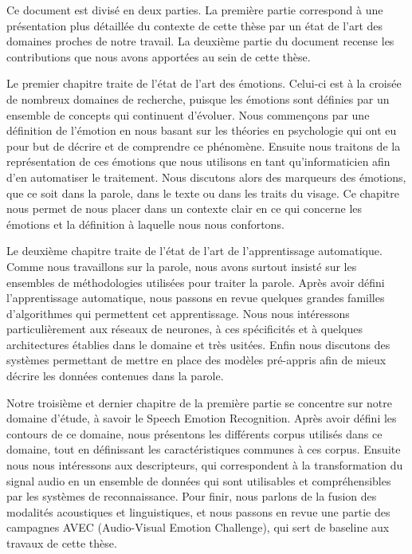 Ce document est divisé en deux parties. La première partie correspond à une présentation plus détaillée du contexte de cette thèse par un état de l'art des domaines proches de notre travail. La deuxième partie du document recense les contributions que nous avons apportées au sein de cette thèse.

Le premier chapitre traite de l'état de l'art des émotions. Celui-ci est à la croisée de nombreux domaines de recherche, puisque les émotions sont définies par un ensemble de concepts qui continuent d'évoluer. Nous commençons par une définition de l'émotion en nous basant sur les théories en psychologie qui ont eu pour but de décrire et de comprendre ce phénomène. Ensuite nous traitons de la représentation de ces émotions que nous utilisons en tant qu'informaticien afin d'en automatiser le traitement. Nous discutons alors des marqueurs des émotions, que ce soit dans la parole, dans le texte ou dans les traits du visage. Ce chapitre nous permet de nous placer dans un contexte clair en ce qui concerne les émotions et la définition à laquelle nous nous confortons.

Le deuxième chapitre traite de l'état de l'art de l'apprentissage automatique. Comme nous travaillons sur la parole, nous avons surtout insisté sur les ensembles de méthodologies utilisées pour traiter la parole. Après avoir défini l'apprentissage automatique, nous passons en revue quelques grandes familles d'algorithmes qui permettent cet apprentissage. Nous nous intéressons particulièrement aux réseaux de neurones, à ces spécificités et à quelques architectures établies dans le domaine et très usitées. Enfin nous discutons des systèmes permettant de mettre en place des modèles pré-appris afin de mieux décrire les données contenues dans la parole.

Notre troisième et dernier chapitre de la première partie se concentre sur notre domaine d'étude, à savoir le Speech Emotion Recognition. Après avoir défini les contours de ce domaine, nous présentons les différents corpus utilisés dans ce domaine, tout en définissant les caractéristiques communes à ces corpus. Ensuite nous nous intéressons aux descripteurs, qui correspondent à la transformation du signal audio en un ensemble de données qui sont utilisables et compréhensibles par les systèmes de reconnaissance. Pour finir, nous parlons de la fusion des modalités acoustiques et linguistiques, et nous passons en revue une partie des campagnes AVEC (Audio-Visual Emotion Challenge), qui sert de baseline aux travaux de cette thèse.

